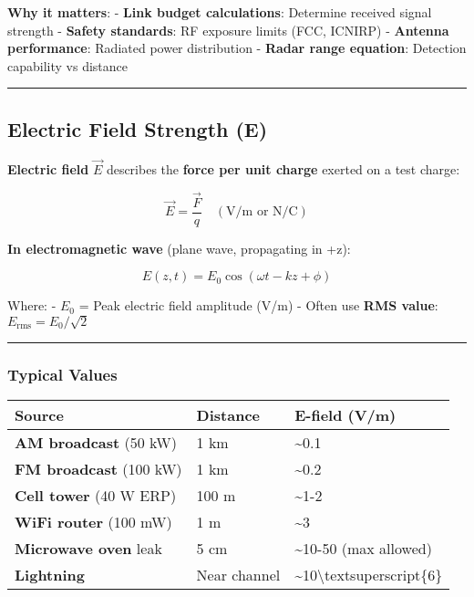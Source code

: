 \textbf{Why it matters}: - \textbf{Link budget calculations}: Determine
received signal strength - \textbf{Safety standards}: RF exposure limits
(FCC, ICNIRP) - \textbf{Antenna performance}: Radiated power
distribution - \textbf{Radar range equation}: Detection capability vs
distance

\begin{center}\rule{0.5\linewidth}{0.5pt}\end{center}

\subsection{Electric Field Strength
(E)}\label{electric-field-strength-e}

\textbf{Electric field} \(\vec{E}\) describes the \textbf{force per unit
charge} exerted on a test charge:

\[
\vec{E} = \frac{\vec{F}}{q} \quad (\text{V/m or N/C})
\]

\textbf{In electromagnetic wave} (plane wave, propagating in +z):

\[
E(z,t) = E_0 \cos(\omega t - kz + \phi)
\]

Where: - \(E_0\) = Peak electric field amplitude (V/m) - Often use
\textbf{RMS value}: \(E_{\text{rms}} = E_0 / \sqrt{2}\)

\begin{center}\rule{0.5\linewidth}{0.5pt}\end{center}

\subsubsection{Typical Values}\label{typical-values}

{\def\LTcaptype{} %
\begin{longtable}[]{@{}lll@{}}
\toprule\noalign{}
Source & Distance & E-field (V/m) \\
\midrule\noalign{}
\endhead
\bottomrule\noalign{}
\endlastfoot
\textbf{AM broadcast} (50 kW) & 1 km & \textasciitilde0.1 \\
\textbf{FM broadcast} (100 kW) & 1 km & \textasciitilde0.2 \\
\textbf{Cell tower} (40 W ERP) & 100 m & \textasciitilde1-2 \\
\textbf{WiFi router} (100 mW) & 1 m & \textasciitilde3 \\
\textbf{Microwave oven} leak & 5 cm & \textasciitilde10-50 (max
allowed) \\
\textbf{Lightning} & Near channel &
\textasciitilde10\textbackslash textsuperscript\{6\} \\
\end{longtable}
}

